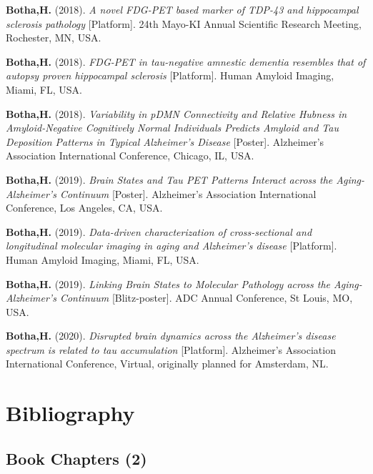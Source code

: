 \documentclass[11pt, a4paper]{awesome-cv}
\begin{document}
\leavevmode\hypertarget{ref-Botha_KI_2018}{}%
\textbf{Botha,H.} (2018). \emph{{A novel FDG-PET based marker of TDP-43
and hippocampal sclerosis pathology}} {[}Platform{]}. {24th Mayo-KI
Annual Scientific Research Meeting}, Rochester, {MN}, {USA}.

\leavevmode\hypertarget{ref-Botha_HAI_2018}{}%
\textbf{Botha,H.} (2018). \emph{{FDG-PET in tau-negative amnestic
dementia resembles that of autopsy proven hippocampal sclerosis}}
{[}Platform{]}. {Human Amyloid Imaging}, Miami, {FL}, {USA}.

\leavevmode\hypertarget{ref-Botha_AIC_2018}{}%
\textbf{Botha,H.} (2018). \emph{{Variability in pDMN Connectivity and
Relative Hubness in Amyloid-Negative Cognitively Normal Individuals
Predicts Amyloid and Tau Deposition Patterns in Typical Alzheimer's
Disease}} {[}Poster{]}. {Alzheimer's Association International
Conference}, Chicago, {IL}, {USA}.

\leavevmode\hypertarget{ref-Botha_AIC_2019}{}%
\textbf{Botha,H.} (2019). \emph{{Brain States and Tau PET Patterns
Interact across the Aging-Alzheimer's Continuum}} {[}Poster{]}.
{Alzheimer's Association International Conference}, Los Angeles, {CA},
{USA}.

\leavevmode\hypertarget{ref-Botha_HAI_2019}{}%
\textbf{Botha,H.} (2019). \emph{{Data-driven characterization of
cross-sectional and longitudinal molecular imaging in aging and
Alzheimer's disease}} {[}Platform{]}. {Human Amyloid Imaging}, Miami,
{FL}, {USA}.

\leavevmode\hypertarget{ref-Botha_ADRD_2019}{}%
\textbf{Botha,H.} (2019). \emph{{Linking Brain States to Molecular
Pathology across the Aging-Alzheimer's Continuum}} {[}Blitz-poster{]}.
{ADC Annual Conference}, St Louis, {MO}, {USA}.

\leavevmode\hypertarget{ref-Botha_AAIC_2020}{}%
\textbf{Botha,H.} (2020). \emph{{Disrupted brain dynamics across the
Alzheimer's disease spectrum is related to tau accumulation}}
{[}Platform{]}. {Alzheimer's Association International Conference},
Virtual, originally planned for Amsterdam, {NL}.

\endgroup

\hypertarget{bibliography}{%
\section{Bibliography}\label{bibliography}}

\hypertarget{book-chapters-2}{%
\subsection{Book Chapters (2)}\label{book-chapters-2}}
\end{document}
